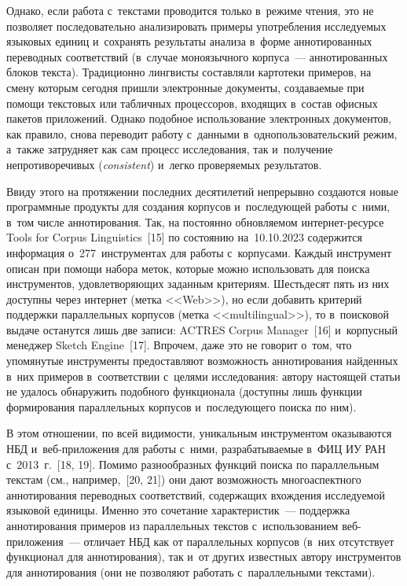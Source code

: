 \begin{multicols}{2}
Однако, если работа с~текстами проводится только в~режиме чтения, это не 
позволяет последовательно анализировать примеры упо\-треб\-ле\-ния 
исследуемых языковых единиц и~сохранять результаты анализа в~форме 
аннотированных переводных соответствий (в~случае моноязычного 
корпуса~--- аннотированных блоков текста). Традиционно лингвисты 
составляли картотеки примеров, на смену которым сегодня пришли 
электронные документы, создаваемые при помощи текстовых или таб\-лич\-ных 
процессоров, входящих в~со\-став офисных пакетов приложений. Однако 
подобное использование электронных документов, как правило, снова 
переводит работу с~данными в~однопользовательский режим, а~также 
за\-труд\-ня\-ет как сам процесс исследования, так и~получение 
непротиворечивых (\textit{consistent}) и~лег\-ко про\-ве\-ря\-емых результатов.

Ввиду этого на протяжении последних десятилетий непрерывно создаются 
новые программные продукты для создания корпусов и~последующей работы с~ними, в~том числе аннотирования. Так, на постоянно обновляемом  
ин\-тер\-нет-ре\-сур\-се Tools for Corpus Linguistics~[15] по состоянию 
на~10.10.2023 содержится информация о~277~инструментах для работы 
с~корпусами. Каждый инструмент описан при помощи набора меток, 
которые можно использовать для поиска инструментов,  
удовле\-тво\-ря\-ющих заданным критериям. Шестьдесят пять из них 
доступны через интернет (метка <<Web>>), но если добавить критерий 
поддержки параллельных корпусов (метка <<multilingual>>), то в~поисковой 
выдаче останутся лишь две записи: ACTRES Corpus Manager~[16] 
и~корпусный менеджер Sketch Engine~[17]. Впрочем, даже это не говорит 
о~том, что упомянутые инструменты предоставляют возможность 
аннотирования найденных в~них примеров в~соответствии с~целями 
исследования: автору настоящей статьи не удалось обнаружить подобного 
функционала (доступны лишь функции формирования параллельных 
корпусов и~последующего поиска по ним).

В этом отношении, по всей видимости, уникальным инструментом 
оказываются НБД и~веб-при\-ло\-же\-ния для 
работы с~ними, раз\-ра\-ба\-ты\-ва\-емые в~ФИЦ ИУ РАН с~2013~г.~[18, 19]. Помимо 
разнообразных функций поиска по параллельным текс\-там (см., например,~[20, 
21]) они дают возможность многоаспектного аннотирования переводных 
соответствий, содержащих вхождения ис\-сле\-ду\-емой языковой единицы. 
Именно это сочетание характеристик~--- под\-держ\-ка аннотирования 
примеров из параллельных текс\-тов с~использованием  
веб-при\-ло\-же\-ния~--- отличает НБД как от параллельных корпусов (в~них 
отсутствует функционал для аннотирования), так и~от других известных 
автору инструментов для аннотирования (они не поз\-во\-ля\-ют работать 
с~параллельными текс\-тами).


\end{multicols}
